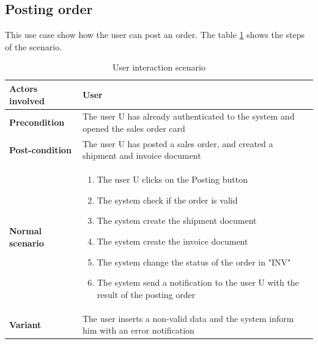 \subsection{Posting order}
This use case show how the user can post an order. The table \ref{tab:5_posting_order} shows the
steps of the scenario.

\begin{table}
    \centering
    \begin{tabular}{|l|p{10cm}|}
        \hline
        \textbf{Actors involved} & User                                                                                   \\
        \hline
        \textbf{Precondition}    & The user U has already authenticated to the system and opened the sales order card     \\
        \hline
        \textbf{Post-condition}  & The user U has posted a sales order, and created a shipment and invoice document       \\
        \hline
        \textbf{Normal scenario} &
        \begin{enumerate}
            \item The user U clicks on the Posting button
            \item The system check if the order is valid
            \item The system create the shipment document
            \item The system create the invoice document
            \item The system change the status of the order in "INV"
            \item The system send a notification to the user U with the result of the posting order
        \end{enumerate}                            \\
        \hline
        \textbf{Variant}         & The user inserts a non-valid data and the system inform him with an error notification \\
        \hline
    \end{tabular}
    \caption{User interaction scenario}
    \label{tab:5_posting_order}
\end{table}
